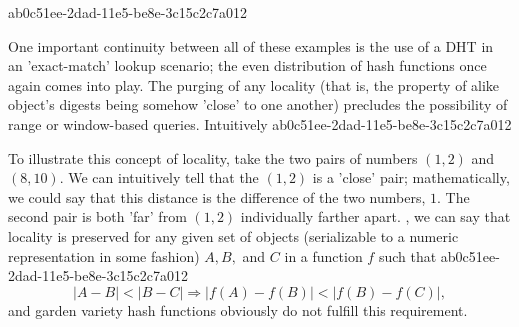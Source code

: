 \documentclass[12pt]{article}
\begin{document}
ab0c51ee-2dad-11e5-be8e-3c15c2c7a012\par One important continuity between all of these examples is the use of a DHT in an 'exact-match' lookup scenario; the even distribution of hash functions once again comes into play. The purging of any locality (that is, the property of alike object's digests being somehow 'close' to one another) precludes the possibility of range or window-based queries. Intuitively
ab0c51ee-2dad-11e5-be8e-3c15c2c7a012
\par To illustrate this concept of locality, take the two pairs of numbers $(1,2)$ and $(8,10)$. We can intuitively tell that the $(1,2)$ is a 'close' pair; mathematically, we could say that this distance is the difference of the two numbers, $1$. The second pair is both 'far' from $(1,2)$ individually farther apart. , we can say that locality is preserved for any given set of objects (serializable to a numeric representation in some fashion) $A,B,$ and $C$ in a function $f$ such that
ab0c51ee-2dad-11e5-be8e-3c15c2c7a012\begin{equation}
|A-B| < |B-C| \Rightarrow |f(A)-f(B)| < |f(B) - f(C)|,
\end{equation}
and garden variety hash functions obviously do not fulfill this requirement.

\printbibliography
\end{document}
